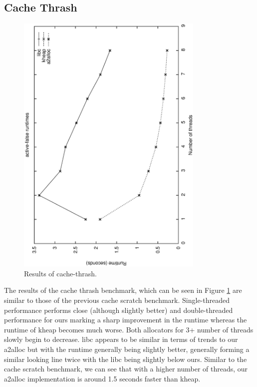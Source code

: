 \documentclass[11pt,twoside]{article}
\begin{document}
\subsection{Cache Thrash}
\begin{figure}[!htbp]
    \centering
    \includegraphics[width=0.8\textwidth]{cache-thrash.ps}
    \caption{Results of cache-thrash.}
    \label{fig:thrash}
\end{figure}

The results of the cache thrash benchmark, which can be seen in Figure \ref{fig:thrash} are similar to those of the previous cache scratch benchmark. Single-threaded performance performs close (although slightly better) and double-threaded performance for ours marking a sharp improvement in the runtime whereas the runtime of kheap becomes much worse. Both allocators for 3+ number of threads slowly begin to decrease. libc appears to be similar in terms of trends to our a2alloc but with the runtime generally being slightly better, generally forming a similar looking line twice with the libc being slightly below ours. Similar to the cache scratch benchmark, we can see that with a higher number of threads, our a2alloc implementation is around 1.5 seconds faster than kheap.
\end{document}
